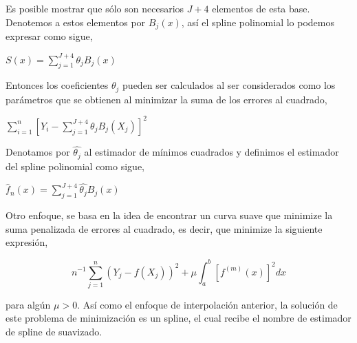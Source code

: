 \vspace{0.5cm}

\hspace{0.4cm}Es posible mostrar que s\'olo son necesarios $J+4$ elementos de esta base. Denotemos a estos elementos por $B_{j}(x)$, as\'i el spline polinomial lo podemos expresar como sigue,

\begin{center}

$\displaystyle{S(x)=\sum_{j=1}^{J+4} \theta_{j}B_{j}(x)}$
\end{center}

\vspace{0.5cm}

\hspace{0.4cm}Entonces los coeficientes $\theta_{j}$ pueden ser calculados al ser considerados como los par\'ametros que se obtienen al minimizar la suma de los errores al cuadrado,

 \begin{center}

$\displaystyle{\sum_{i=1}^{n} \left[ Y_{i} - \sum_{j=1}^{J+4} \theta_{j}B_{j}(X_{j})\right]^2}$
\end{center}

\vspace{0.5cm}

\hspace{0.4cm}Denotamos por $\hat{\theta_{j}}$ al estimador de m\'inimos cuadrados y definimos el estimador del spline polinomial como sigue,

 \begin{center}

$\displaystyle{ \hat{f}_{n}(x) = \sum_{j=1}^{J+4} \hat{\theta_{j}}B_{j}(x)}$
\end{center}

\vspace{0.5cm} Otro enfoque, se basa en la idea de encontrar un curva suave que minimize la suma penalizada de errores al cuadrado, es decir, que minimize la siguiente expresi\'on,

\begin{equation}\label{min}
  n^{-1}\sum_{j=1}^{n}(Y_{j}-f(X_{j}))^2+\mu \int_{a}^{b} [f^{(m)} (x)]^2 dx
\end{equation}

\vspace{0.5cm}


\noindent para alg\'un $\mu > 0$. As\'i como el enfoque de interpolaci\'on anterior, la soluci\'on de este problema de minimizaci\'on es un spline, el cual recibe el nombre de estimador de spline de suavizado.

